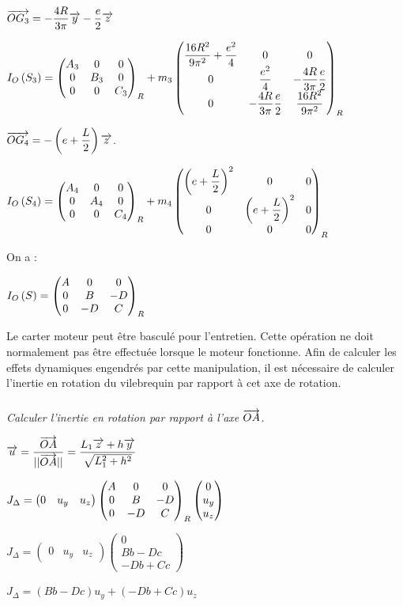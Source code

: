 \documentclass[10pt,fleqn]{article} %
\begin{document}
\begin{multicols}{2}
\begin{corrige}
$\vect{OG_3} = -\dfrac{4R}{3\pi}  \vect{y}-\dfrac{e}{2}\vect{z}$

$\inertie{O}{S_3}=\matinertie{A_3}{B_3}{C_3}{0}{0}{0}{R}
+m_3\matinertie{\dfrac{16R^2}{9\pi^2}+\dfrac{e^2}{4}}{\dfrac{e^2}{4}}{\dfrac{16R^2}{9\pi^2}}{-\dfrac{4R}{3\pi}\dfrac{e}{2}}{0}{0}{R}$

$\vect{OG_4} = -\left(e+\dfrac{L}{2}\right)\vect{z}$.

$\inertie{O}{S_4}=\matinertie{A_4}{A_4}{C_4}{0}{0}{0}{R}
+m_4\matinertie{\left(e+\dfrac{L}{2}\right)^2}{\left(e+\dfrac{L}{2}\right)^2}{0}{0}{0}{0}{R}$

On a : 

$\inertie{O}{S}=\matinertie{A}{B}{C}{-D}{0}{0}{R}$
\end{corrige}

Le carter moteur peut être basculé pour l’entretien. Cette opération ne doit normalement pas être effectuée lorsque le moteur fonctionne. Afin de calculer les effets dynamiques engendrés par cette manipulation, il est nécessaire de calculer l’inertie en rotation du vilebrequin par rapport à cet axe de rotation.

\subparagraph{}\textit{Calculer l’inertie en rotation par rapport à l’axe $\vect{OA}$.}
\begin{corrige}
$\vect{u}=\dfrac{\vect{OA}}{||\vect{OA}||}=\dfrac{L_1\vect{z}+h\vect{y}}{\sqrt{L_1^2+h^2}}$

$J_{\Delta}=\begin{pmatrix} 0 & u_y &  u_z \end{pmatrix} \matinertie{A}{B}{C}{-D}{0}{0}{R}
\begin{pmatrix} 0 \\ u_y \\  u_z \end{pmatrix}$

$J_{\Delta}=\begin{pmatrix} 0 & u_y &  u_z \end{pmatrix} 
\begin{pmatrix} 0 \\ Bb-Dc \\  -Db +Cc \end{pmatrix}$

$J_{\Delta}= \left( Bb-Dc\right)u_y + \left( -Db +Cc\right)u_z$

\end{corrige}



\ifprof
\else
\end{multicols}
\end{document}
